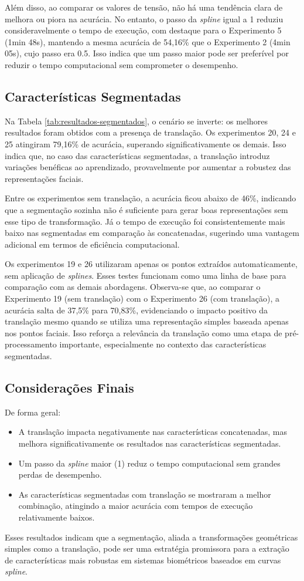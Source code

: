 Além disso, ao comparar os valores de tensão, não há uma tendência clara de melhora ou piora na acurácia. No entanto, o passo da \textit{spline} igual a 1 reduziu consideravelmente o tempo de execução, com destaque para o Experimento 5 (1min 48s), mantendo a mesma acurácia de 54,16\% que o Experimento 2 (4min 05s), cujo passo era 0.5. Isso indica que um passo maior pode ser preferível por reduzir o tempo computacional sem comprometer o desempenho.

\subsection{Características Segmentadas}

Na Tabela \ref{tab:resultados-segmentados}, o cenário se inverte: os melhores resultados foram obtidos com a presença de translação. Os experimentos 20, 24 e 25 atingiram 79,16\% de acurácia, superando significativamente os demais. Isso indica que, no caso das características segmentadas, a translação introduz variações benéficas ao aprendizado, provavelmente por aumentar a robustez das representações faciais.

Entre os experimentos sem translação, a acurácia ficou abaixo de 46\%, indicando que a segmentação sozinha não é suficiente para gerar boas representações sem esse tipo de transformação. Já o tempo de execução foi consistentemente mais baixo nas segmentadas em comparação às concatenadas, sugerindo uma vantagem adicional em termos de eficiência computacional.

Os experimentos 19 e 26 utilizaram apenas os pontos extraídos automaticamente, sem aplicação de \textit{splines}. Esses testes funcionam como uma linha de base para comparação com as demais abordagens. Observa-se que, ao comparar o Experimento 19 (sem translação) com o Experimento 26 (com translação), a acurácia salta de 37,5\% para 70,83\%, evidenciando o impacto positivo da translação mesmo quando se utiliza uma representação simples baseada apenas nos pontos faciais. Isso reforça a relevância da translação como uma etapa de pré-processamento importante, especialmente no contexto das características segmentadas.

\subsection{Considerações Finais}

De forma geral:

\begin{itemize}
    \item A translação impacta negativamente nas características concatenadas, mas melhora significativamente os resultados nas características segmentadas.
    \item Um passo da \textit{spline} maior (1) reduz o tempo computacional sem grandes perdas de desempenho.
    \item As características segmentadas com translação se mostraram a melhor combinação, atingindo a maior acurácia com tempos de execução relativamente baixos.
\end{itemize}

Esses resultados indicam que a segmentação, aliada a transformações geométricas simples como a translação, pode ser uma estratégia promissora para a extração de características mais robustas em sistemas biométricos baseados em curvas \textit{spline}.